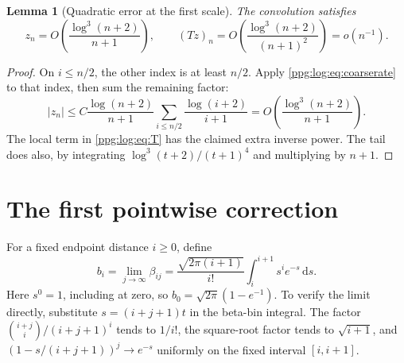 \documentclass[11pt,letterpaper]{article}
\newtheorem{lemma}[theorem]{Lemma}
\theoremstyle{remark}\newtheorem{remark}[theorem]{Remark}
\numberwithin{equation}{section}
\newcommand{\dd}{\mathrm d}
\begin{document}
\begin{lemma}[Quadratic error at the first scale]\label{ppg:log:lem:firstquadratic}
The convolution satisfies
\begin{equation}\label{ppg:log:eq:quadraticcoarse}
 z_n=O\!\left(\frac{\log^3(n+2)}{n+1}\right),\qquad
 (Tz)_n=O\!\left(\frac{\log^3(n+2)}{(n+1)^2}\right)=o(n^{-1}).
\end{equation}
\end{lemma}
\begin{proof}
On $i\le n/2$, the other index is at least $n/2$. Apply \eqref{ppg:log:eq:coarserate} to that index, then sum the remaining factor:
\[
 |z_n|\le C\frac{\log(n+2)}{n+1}
             \sum_{i\le n/2}\frac{\log(i+2)}{i+1}
 =O\!\left(\frac{\log^3(n+2)}{n+1}\right).
\]
The local term in \eqref{ppg:log:eq:T} has the claimed extra inverse power. The tail does also, by integrating $\log^3(t+2)/(t+1)^4$ and multiplying by $n+1$.
\end{proof}

\section{The first pointwise correction}\label{ppg:log:sec:first}
For a fixed endpoint distance $i\ge0$, define
\begin{equation}\label{ppg:log:eq:bi}
 b_i=\lim_{j\to\infty}\beta_{ij}
     =\frac{\sqrt{2\pi(i+1)}}{i!}\int_i^{i+1}s^ie^{-s}\,\dd s.
\end{equation}
Here $s^0=1$, including at zero, so $b_0=\sqrt{2\pi}(1-e^{-1})$. To verify the limit directly, substitute $s=(i+j+1)t$ in the beta-bin integral. The factor $\binom{i+j}{i}/(i+j+1)^i$ tends to $1/i!$, the square-root factor tends to $\sqrt{i+1}$, and $(1-s/(i+j+1))^j\to e^{-s}$ uniformly on the fixed interval $[i,i+1]$.
\end{document}
